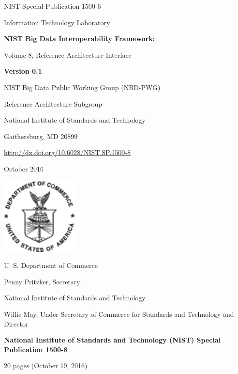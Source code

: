 \documentclass[11pt]{article}
\begin{document}
\begin{flushright}
NIST Special Publication 1500-6

Information Technology Laboratory

\bigskip 

{\Large\bf NIST Big Data Interoperability Framework:

\smallskip

Volume 8, Reference Architecture Interface
}

\bigskip

{\bf Version 0.1}

\bigskip \bigskip \bigskip \bigskip \bigskip \bigskip

NIST Big Data Public Working Group (NBD-PWG)

Reference Architecture Subgroup

National Institute of Standards and Technology

Gaithersburg, MD 20899

\bigskip

\url{http://dx.doi.org/10.6028/NIST.SP.1500-8}

\bigskip

October 2016

\vfill

\begin{flushright}
\includegraphics{images/dep-commerce.png}
\end{flushright}

 
U. S. Department of Commerce

Penny Pritzker, Secretary

\bigskip
National Institute of Standards and Technology

Willie May, Under Secretary of Commerce for Standards and Technology and Director
\end{flushright}

\newpage

\begin{center}
{\bf National Institute of Standards and Technology (NIST) Special
  Publication 1500-8}

20 pages (October 19, 2016)
\end{center}
\end{document}
